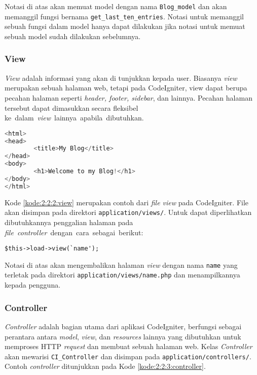 Notasi di atas akan memuat model dengan nama \verb|Blog_model| dan akan memanggil fungsi bernama \verb|get_last_ten_entries|. Notasi untuk memanggil sebuah fungsi dalam model hanya dapat dilakukan jika notasi untuk memuat sebuah model sudah dilakukan sebelumnya.

\subsubsection{View}
\label{sub:2:2:2:View}

\textit{View} adalah informasi yang akan di tunjukkan kepada user. Biasanya \textit{view} merupakan sebuah halaman web, tetapi pada CodeIgniter, view dapat berupa pecahan halaman seperti \textit{header, footer, sidebar}, dan lainnya. Pecahan halaman tersebut dapat dimasukkan secara fleksibel \mbox{ke dalam \textit{view} lainnya apabila dibutuhkan.}

\begin{lstlisting}[language=php, caption={Contoh \textit{view}}, label={kode:2:2:2:view}]
<html>
<head>
        <title>My Blog</title>
</head>
<body>
        <h1>Welcome to my Blog!</h1>
</body>
</html>
\end{lstlisting}

Kode \ref{kode:2:2:2:view} merupakan contoh dari \textit{file view} pada CodeIgniter. File akan disimpan pada direktori \verb|application/views/|. Untuk dapat diperlihatkan dibutuhkannya penggalian halaman pada \mbox{\textit{file controller} dengan cara sebagai berikut:}

\begin{center}
	\verb|$this->load->view(`name');|
\end{center}

Notasi di atas akan mengembalikan halaman \textit{view} dengan nama \verb|name| yang terletak pada direktori \verb|application/views/name.php| dan menampilkannya kepada pengguna.

\subsubsection{Controller}
\label{sub:2:2:3:Controller}

\textit{Controller} adalah bagian utama dari aplikasi CodeIgniter, berfungsi sebagai perantara antara \textit{model}, \textit{view}, dan \textit{resources} lainnya yang dibutuhkan untuk memproses HTTP \textit{request} dan membuat sebuah halaman web. Kelas \textit{Controller} akan mewarisi \verb|CI_Controller| dan disimpan pada \verb|application/controllers/|. Contoh \textit{controller} ditunjukkan pada Kode \ref{kode:2:2:3:controller}.


